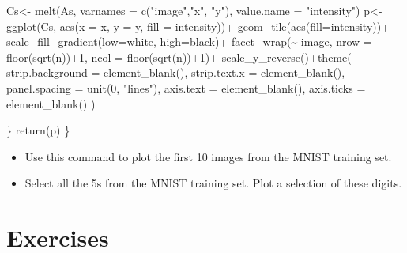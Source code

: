 \documentclass[
]{book}
\newenvironment{Shaded}{\begin{snugshade}}{\end{snugshade}}
\newcommand{\AttributeTok}[1]{\textcolor[rgb]{0.77,0.63,0.00}{#1}}
\newcommand{\DecValTok}[1]{\textcolor[rgb]{0.00,0.00,0.81}{#1}}
\newcommand{\FunctionTok}[1]{\textcolor[rgb]{0.00,0.00,0.00}{#1}}
\newcommand{\NormalTok}[1]{#1}
\newcommand{\OtherTok}[1]{\textcolor[rgb]{0.56,0.35,0.01}{#1}}
\newcommand{\SpecialCharTok}[1]{\textcolor[rgb]{0.00,0.00,0.00}{#1}}
\newcommand{\StringTok}[1]{\textcolor[rgb]{0.31,0.60,0.02}{#1}}
\theoremstyle{definition}
\theoremstyle{definition}
\theoremstyle{definition}
\theoremstyle{definition}
\theoremstyle{remark}
\begin{document}
\begin{Shaded}
\begin{Highlighting}[]
\NormalTok{    Cs}\OtherTok{\textless{}{-}} \FunctionTok{melt}\NormalTok{(As, }\AttributeTok{varnames =} \FunctionTok{c}\NormalTok{(}\StringTok{"image"}\NormalTok{,}\StringTok{"x"}\NormalTok{, }\StringTok{"y"}\NormalTok{), }
              \AttributeTok{value.name =} \StringTok{"intensity"}\NormalTok{)}
\NormalTok{    p}\OtherTok{\textless{}{-}}\FunctionTok{ggplot}\NormalTok{(Cs, }\FunctionTok{aes}\NormalTok{(}\AttributeTok{x =}\NormalTok{ x, }\AttributeTok{y =}\NormalTok{ y, }\AttributeTok{fill =}\NormalTok{ intensity))}\SpecialCharTok{+}
      \FunctionTok{geom\_tile}\NormalTok{(}\FunctionTok{aes}\NormalTok{(}\AttributeTok{fill=}\NormalTok{intensity))}\SpecialCharTok{+}
      \FunctionTok{scale\_fill\_gradient}\NormalTok{(}\AttributeTok{low=}\StringTok{\textquotesingle{}white\textquotesingle{}}\NormalTok{, }\AttributeTok{high=}\StringTok{\textquotesingle{}black\textquotesingle{}}\NormalTok{)}\SpecialCharTok{+}
      \FunctionTok{facet\_wrap}\NormalTok{(}\SpecialCharTok{\textasciitilde{}}\NormalTok{ image, }\AttributeTok{nrow =} \FunctionTok{floor}\NormalTok{(}\FunctionTok{sqrt}\NormalTok{(n))}\SpecialCharTok{+}\DecValTok{1}\NormalTok{, }
                 \AttributeTok{ncol =} \FunctionTok{floor}\NormalTok{(}\FunctionTok{sqrt}\NormalTok{(n))}\SpecialCharTok{+}\DecValTok{1}\NormalTok{)}\SpecialCharTok{+}
      \FunctionTok{scale\_y\_reverse}\NormalTok{()}\SpecialCharTok{+}\FunctionTok{theme}\NormalTok{(}
        \AttributeTok{strip.background =} \FunctionTok{element\_blank}\NormalTok{(),}
        \AttributeTok{strip.text.x =} \FunctionTok{element\_blank}\NormalTok{(),}
        \AttributeTok{panel.spacing =} \FunctionTok{unit}\NormalTok{(}\DecValTok{0}\NormalTok{, }\StringTok{"lines"}\NormalTok{),}
        \AttributeTok{axis.text =} \FunctionTok{element\_blank}\NormalTok{(),}
        \AttributeTok{axis.ticks =} \FunctionTok{element\_blank}\NormalTok{()}
\NormalTok{      ) }
    
\NormalTok{  \}}
  \FunctionTok{return}\NormalTok{(p)}
\NormalTok{\}}
\end{Highlighting}
\end{Shaded}

\begin{itemize}
\item
  Use this command to plot the first 10 images from the MNIST training set.
\item
  Select all the 5s from the MNIST training set. Plot a selection of these digits.
\end{itemize}

\hypertarget{exercises}{%
\section{Exercises}\label{exercises}}
\end{document}
